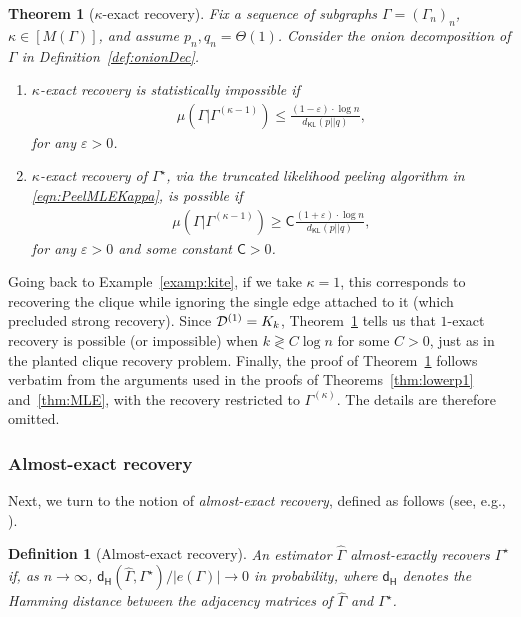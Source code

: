\documentclass[12pt]{article}
\newtheorem{definition}{Definition}
\newtheorem{theorem}{Theorem}
\newcommand{\calD}{{\cal D}}
\newcommand{\s}[1]{\mathsf{#1}}
\begin{document}
\begin{theorem}[$\kappa$-exact recovery]\label{thm:kappaExactRec}
Fix a sequence of subgraphs $\Gamma=(\Gamma_n)_n$, $\kappa\in[M(\Gamma)]$, and assume $p_n,q_n=\Theta(1)$. Consider the onion decomposition of $\Gamma$ in Definition~\ref{def:onionDec}.
\begin{enumerate}
    \item $\kappa$-exact recovery is statistically impossible if
\begin{align}
        \mu(\Gamma\vert\Gamma^{(\kappa-1)})\leq \frac{(1-\varepsilon)\cdot \log n}{d_{\s{KL}}(p||q)},\label{eq:condDenseStatKappa}
\end{align}
for any $\varepsilon>0$.
\item $\kappa$-exact recovery of $\Gamma^\star$, via the truncated likelihood peeling algorithm in \eqref{eqn:PeelMLEKappa}, is possible if
\begin{align}
    \mu(\Gamma\vert\Gamma^{(\kappa-1)})\geq \s{C}\frac{(1+\varepsilon)\cdot \log n}{d_{\s{KL}}(p||q)},\label{eqn:MLEcondKappa}
\end{align}
for any $\varepsilon>0$ and some constant $\s{C}>0$.
\end{enumerate}
\end{theorem}
Going back to Example~\ref{examp:kite}, if we take $\kappa = 1$, this corresponds to recovering the clique while ignoring the single edge attached to it (which precluded strong recovery). Since $\calD^{(1)} = K_k$, Theorem~\ref{thm:kappaExactRec} tells us that $1$-exact recovery is possible (or impossible) when $k \gtrless C \log n$ for some $C > 0$, just as in the planted clique recovery problem. Finally, the proof of Theorem~\ref{thm:kappaExactRec} follows verbatim from the arguments used in the proofs of Theorems~\ref{thm:lowerp1} and~\ref{thm:MLE}, with the recovery restricted to $\Gamma^{(\kappa)}$. The details are therefore omitted.

\subsubsection{Almost-exact recovery} 

Next, we turn to the notion of \emph{almost-exact recovery}, defined as follows (see, e.g., \cite{hajek2016information,wu2018statistical}).
\begin{definition}[Almost-exact recovery]
An estimator $\hat{\Gamma}$ almost-exactly recovers $\Gamma^\star$ if, as $n \to \infty$, $\s{d}_{\s{H}}(\hat{\Gamma},\Gamma^\star)/|e(\Gamma)| \to 0$ in probability, where $\s{d}_{\s{H}}$ denotes the Hamming distance between the adjacency matrices of $\hat{\Gamma}$ and $\Gamma^\star$. 
\end{definition}
\end{document}
